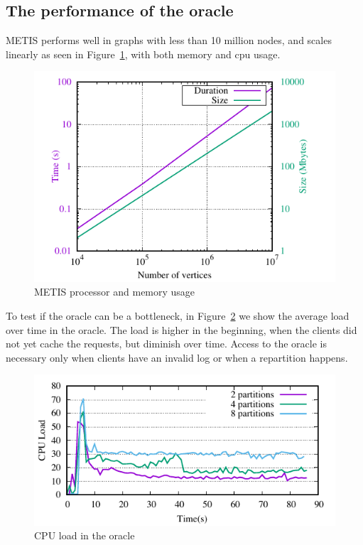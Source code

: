 \subsection{The performance of the oracle}

METIS performs well in graphs with less than 10 million nodes, and
scales linearly as seen in Figure~\ref{fig:metis_size_time}, with both
memory and cpu usage.

\begin{figure}[ht!]
  \centering
    \includegraphics[width=\columnwidth]{figures/metis_size_time}
	\caption{METIS processor and memory usage}
	\label{fig:metis_size_time}
\end{figure}

To test if the oracle can be a bottleneck, in
Figure~\ref{fig:cpu_oracle} we show the average load over time in the
oracle.  The load is higher in the beginning, when the clients did not
yet cache the requests, but diminish over time. Access to the oracle
is necessary only when clients have an invalid log or when a
repartition happens.

\begin{figure}[ht]
	\includegraphics{figures/experiments/oracle-load}
	\caption{CPU load in the oracle}
	\label{fig:cpu_oracle}
\end{figure}

